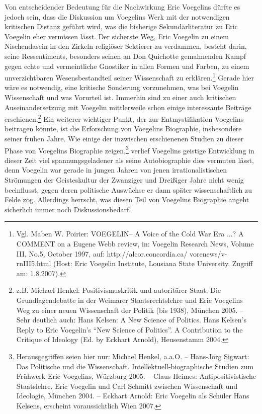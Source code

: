 Von entscheidender Bedeutung für die Nachwirkung Eric Voegelins dürfte es
jedoch sein, dass die Diskussion um Voegelins Werk mit der notwendigen
kritischen Distanz geführt wird, was die bisherige Sekundärliteratur zu Eric
Voegelin eher vermissen lässt. Der sicherste Weg, Eric Voegelin zu einem
Nischendasein in den Zirkeln religiöser Sektierer zu verdammen, besteht darin,
seine Ressentiments, besonders seinen an Don Quichotte gemahnenden Kampf gegen
echte und vermeintliche Gnostiker in allen Formen und Farben, zu einem
unverzichtbaren Wesensbestandteil seiner Wissenschaft zu
erklären.\footnote{Vgl.  Maben W. Poirier: VOEGELIN-- A Voice of the Cold War
  Era ...? A COMMENT on a Eugene Webb review, in: Voegelin Research News,
  Volume III, No.5, October 1997, auf: http://alcor.concordia.ca/\~{
  }vorenews/v-rnIII5.html (Host: Eric Voegelin Institute, Lousiana State
  University. Zugriff am: 1.8.2007).}  Gerade hier wäre es notwendig, eine
kritische Sonderung vorzunehmen, was bei Voegelin Wissenschaft und was
Vorurteil ist. Immerhin sind zu einer auch kritischen Auseinandersetzung mit
Voegelin mittlerweile schon einige interessante Beiträge
erschienen.\footnote{z.B. Michael Henkel: Positivismuskritik und autoritärer
  Staat.  Die Grundlagendebatte in der Weimarer Staatsrechtslehre und Eric
  Voegelins Weg zu einer neuen Wissenschaft der Politik (bis 1938), München
  2005. -- Sehr deutlich auch: Hans Kelsen: A New Science of Politics. Hans
  Kelsen's Reply to Eric Voegelin's "`New Science of Politics"'. A
  Contribution to the Critique of Ideology (Ed. by Eckhart Arnold),
  Heusenstamm 2004.}  Ein weiterer wichtiger Punkt, der zur Entmystifikation
Voegelins beitragen könnte, ist die Erforschung von Voegelins Biographie,
insbesondere seiner frühen Jahre. Wie einige der inzwischen erschienenen
Studien zu dieser Phase von Voegelins Biographie
zeigen,\footnote{Herausgegriffen seien hier nur: Michael Henkel, a.a.O. --
  Hans-Jörg Sigwart: Das Politische und die Wissenschaft.
  Intellektuell-biographische Studien zum Frühwerk Eric Voegelins, Würzburg
  2005. -- Claus Heimes: Antipositivistische Staatslehre. Eric Voegelin und
  Carl Schmitt zwischen Wissenschaft und Ideologie, München 2004. -- Eckhart
  Arnold: Eric Voegelin als Schüler Hans Kelsens, erscheint voraussichtlich
  Wien 2007.} verlief Voegelins geistige Entwicklung in dieser Zeit viel
spannungsgeladener als seine Autobiographie dies vermuten lässt, denn Voegelin
war gerade in jungen Jahren von jenen irrationalistischen Strömungen der
Geisteskultur der Zwanziger und Dreißiger Jahre nicht wenig beeinflusst, gegen
deren politische Auswüchse er dann später wissenschaftlich zu Felde zog.
Allerdings herrscht, was diesen Teil von Voegelins Biographie angeht
sicherlich immer noch Diskussionsbedarf.

